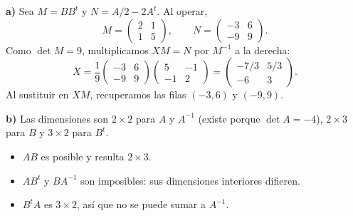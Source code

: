 \textbf{a)} Sea $M=BB^t$ y $N=A/2-2A^t$. Al operar,
\[
M=\begin{pmatrix}2&1\\1&5\end{pmatrix},\qquad
N=\begin{pmatrix}-3&6\\-9&9\end{pmatrix}.
\]
Como $\det M=9$, multiplicamos $XM=N$ por $M^{-1}$ a la derecha:
\[
X=\frac19\begin{pmatrix}-3&6\\-9&9\end{pmatrix}
\begin{pmatrix}5&-1\\-1&2\end{pmatrix}
=\boxed{\begin{pmatrix}-7/3&5/3\\-6&3\end{pmatrix}}.
\]
Al sustituir en $XM$, recuperamos las filas $(-3,6)$ y $(-9,9)$.

\textbf{b)} Las dimensiones son $2\times2$ para $A$ y $A^{-1}$
(existe porque $\det A=-4$), $2\times3$ para $B$ y $3\times2$ para $B^t$.
\begin{itemize}
\item $AB$ es posible y resulta $2\times3$.
\item $AB^t$ y $BA^{-1}$ son imposibles: sus dimensiones interiores difieren.
\item $B^tA$ es $3\times2$, así que no se puede sumar a $A^{-1}$.
\end{itemize}
